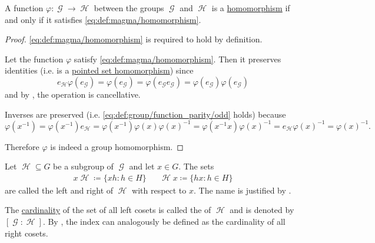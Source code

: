 \begin{proposition}\label{thm:group_homomorphism_single_condition}
  A function \( \varphi: \mscrG \to \mscrH \) between the groups \( \mscrG \) and \( \mscrH \) is a \hyperref[def:group/homomorphism]{homomorphism} if and only if it satisfies \eqref{eq:def:magma/homomorphism}.
\end{proposition}
\begin{proof}
  \SufficiencySubProof \eqref{eq:def:magma/homomorphism} is required to hold by definition.

  \NecessitySubProof Let the function \( \varphi \) satisfy \eqref{eq:def:magma/homomorphism}. Then it preserves identities (i.e. is a \hyperref[def:pointed_set/homomorphism]{pointed set homomorphism}) since
  \begin{equation*}
    e_{\mscrH} \varphi(e_{\mscrG}) = \varphi(e_{\mscrG}) = \varphi(e_{\mscrG} e_{\mscrG}) = \varphi(e_{\mscrG}) \varphi(e_{\mscrG})
  \end{equation*}
  and by , the operation is cancellative.

  Inverses are preserved (i.e. \eqref{eq:def:group/function_parity/odd} holds) because
  \begin{equation*}
    \varphi(x^{-1})
    =
    \varphi(x^{-1}) e_{\mscrH}
    =
    \varphi(x^{-1}) \varphi(x) \varphi(x)^{-1}
    =
    \varphi(x^{-1} x) \varphi(x)^{-1}
    =
    e_{\mscrH} \varphi(x)^{-1}
    =
    \varphi(x)^{-1}.
  \end{equation*}

  Therefore \( \varphi \) is indeed a group homomorphism.
\end{proof}

\begin{definition}\label{def:group_cosets}
  Let \( \mscrH \subseteq G \) be a subgroup of \( \mscrG \) and let \( x \in G \). The sets
  \begin{align*}
    x \mscrH \coloneqq \{ xh \colon h \in H \}
    &&
    \mscrH x \coloneqq \{ hx \colon h \in H \}
  \end{align*}
  are called the left and right  of \( \mscrH \) with respect to \( x \). The name is justified by .

  The \hyperref[def:cardinal]{cardinality} of the set of all left cosets is called the  of \( \mscrH \) and is denoted by \( [\mscrG : \mscrH] \). By , the index can analogously be defined as the cardinality of all right cosets.
\end{definition}

